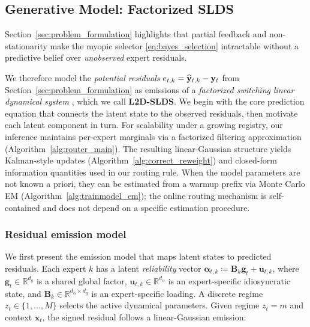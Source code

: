\subsection{Generative Model: Factorized SLDS}
\label{sec:generative_model}

Section~\ref{sec:problem_formulation} highlights that partial feedback and non-stationarity make the
myopic selector \eqref{eq:bayes_selection} intractable without a predictive belief over \emph{unobserved}
expert residuals.

We therefore model the \emph{potential residuals} \(e_{t,k}=\widehat{\mathbf{y}}_{t,k}-\mathbf{y}_t\) from
Section~\ref{sec:problem_formulation} as emissions of a \emph{factorized switching linear dynamical
system} \citep{bengio1994input, linderman2016recurrent, hu2024modeling}, which we call \textbf{L2D-SLDS}.
We begin with the core prediction equation that connects the latent state to the observed residuals,
then motivate each latent component in turn. For scalability under a
growing registry, our inference maintains per-expert marginals via a factorized filtering
approximation (Algorithm~\ref{alg:router_main}). The resulting linear-Gaussian structure yields
Kalman-style updates (Algorithm~\ref{alg:correct_reweight}) and closed-form information quantities
used in our routing rule. When the model parameters are not known a priori, they can be estimated
from a warmup prefix via Monte Carlo EM (Algorithm~\ref{alg:trainmodel_em}); the online routing
mechanism is self-contained and does not depend on a specific estimation procedure.

\subsubsection{Residual emission model}
\label{sec:emission_model}

We first present the emission model that maps latent states to predicted residuals.
Each expert \(k\) has a latent \emph{reliability} vector
\(\boldsymbol\alpha_{t,k}\coloneqq \mathbf{B}_k\mathbf{g}_t+\mathbf{u}_{t,k}\),
where \(\mathbf{g}_t\in\mathbb{R}^{d_g}\) is a shared global factor,
\(\mathbf{u}_{t,k}\in\mathbb{R}^{d_\alpha}\) is an expert-specific idiosyncratic state,
and \(\mathbf{B}_k\in\mathbb{R}^{d_\alpha\times d_g}\) is an expert-specific loading.
A discrete regime \(z_t\in\{1,\dots,M\}\) selects the active dynamical parameters.
Given regime \(z_t=m\) and context \(\mathbf{x}_t\), the signed residual follows a linear-Gaussian
emission:

